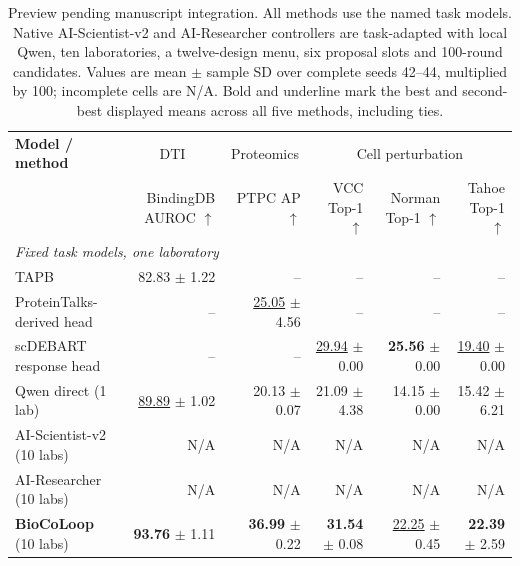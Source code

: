 \begin{table}[t]
\centering\footnotesize
\setlength{\tabcolsep}{3pt}
\renewcommand{\arraystretch}{1.12}
\begin{tabularx}{\linewidth}{@{}Xrrrrr@{}}
\toprule
\textbf{Model / method} & \multicolumn{1}{c}{DTI} & \multicolumn{1}{c}{Proteomics} & \multicolumn{3}{c}{Cell perturbation} \\
\cmidrule(lr){2-2}\cmidrule(lr){3-3}\cmidrule(l){4-6}
 & \shortstack{BindingDB\\AUROC $\uparrow$} & \shortstack{PTPC\\AP $\uparrow$} & \shortstack{VCC\\Top-1 $\uparrow$} & \shortstack{Norman\\Top-1 $\uparrow$} & \shortstack{Tahoe\\Top-1 $\uparrow$} \\
\midrule
\multicolumn{6}{l}{\textit{Fixed task models, one laboratory}} \\
TAPB & 82.83 $\pm$ 1.22 & -- & -- & -- & -- \\
ProteinTalks-derived head & -- & \underline{25.05} $\pm$ 4.56 & -- & -- & -- \\
scDEBART response head & -- & -- & \underline{29.94} $\pm$ 0.00 & \textbf{25.56} $\pm$ 0.00 & \underline{19.40} $\pm$ 0.00 \\
\midrule
Qwen direct (1 lab) & \underline{89.89} $\pm$ 1.02 & 20.13 $\pm$ 0.07 & 21.09 $\pm$ 4.38 & 14.15 $\pm$ 0.00 & 15.42 $\pm$ 6.21 \\
AI-Scientist-v2 (10 labs) & N/A & N/A & N/A & N/A & N/A \\
AI-Researcher (10 labs) & N/A & N/A & N/A & N/A & N/A \\
\textbf{BioCoLoop} (10 labs) & \textbf{93.76} $\pm$ 1.11 & \textbf{36.99} $\pm$ 0.22 & \textbf{31.54} $\pm$ 0.08 & \underline{22.25} $\pm$ 0.45 & \textbf{22.39} $\pm$ 2.59 \\
\bottomrule
\end{tabularx}
\caption{Preview pending manuscript integration. All methods use the named task models. Native AI-Scientist-v2 and AI-Researcher controllers are task-adapted with local Qwen, ten laboratories, a twelve-design menu, six proposal slots and 100-round candidates. Values are mean $\pm$ sample SD over complete seeds 42--44, multiplied by 100; incomplete cells are N/A. Bold and underline mark the best and second-best displayed means across all five methods, including ties.}
\label{tab:public-harness-preview}
\end{table}
